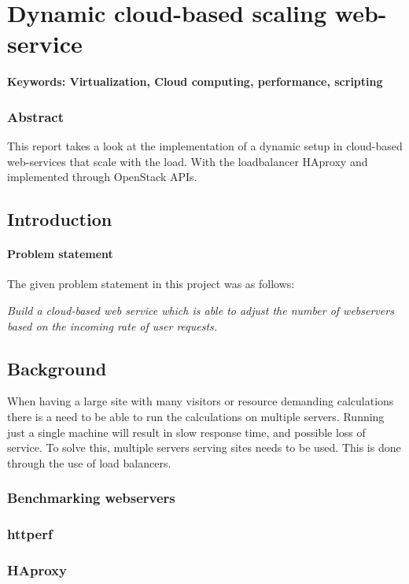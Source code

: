 \chapter{Dynamic cloud-based scaling web-service}

\textbf{Keywords: Virtualization, Cloud computing, performance, scripting} 

\subsection*{Abstract}
This report takes a look at the implementation of a dynamic setup in cloud-based
web-services that scale with the load. With the loadbalancer HAproxy and
implemented through OpenStack APIs.

\section{Introduction}

\subsubsection{Problem statement}

The given problem statement in this project was as follows:

\emph{Build a cloud-based web service which is able to adjust the number of
webservers based on the incoming rate of user requests.}

\section{Background}
When having a large site with many visitors or resource demanding calculations
there is a need to be able to run the calculations on multiple servers. Running
just a single machine will result in slow response time, and possible loss of
service. To solve this, multiple servers serving sites needs to be used. This
is done through the use of load balancers. 



\subsection{Benchmarking webservers}

\subsection{httperf}

\subsection{HAproxy}

